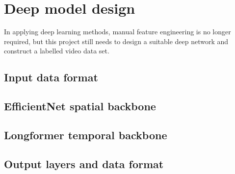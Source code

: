 \section{Deep model design}
\label{sec:Deep model design}
In applying deep learning methods, manual feature engineering is no longer required, but this project still needs to design a suitable deep network and construct a labelled video data set.

\subsection{Input data format}

\subsection{EfficientNet spatial backbone}

\subsection{Longformer temporal backbone}

\subsection{Output layers and data format}
